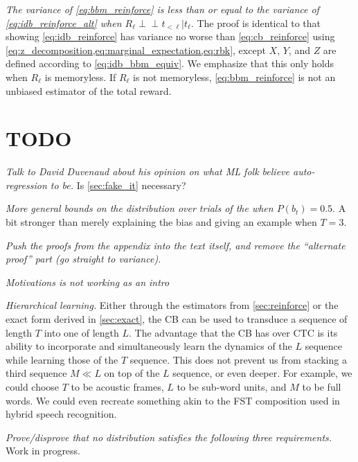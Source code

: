 \documentclass{article}
\newcommand{\ind}{\perp\!\!\!\!\perp}
\begin{document}
\emph{The variance of \cref{eq:bbm_reinforce} is less than or equal to the
variance of \cref{eq:idb_reinforce_alt} when $R_\ell \ind t_{< \ell} |
t_\ell$}. The proof is identical to that showing \cref{eq:idb_reinforce}
has variance no worse than \cref{eq:cb_reinforce} using
\cref{eq:z_decomposition,eq:marginal_expectation,eq:rbk}, except $X$, $Y$, and
$Z$ are defined according to \cref{eq:idb_bbm_equiv}. We emphasize that this
only holds when $R_\ell$ is memoryless. If $R_\ell$ is not memoryless,
\cref{eq:bbm_reinforce} is not an unbiased estimator of the total reward.

\section{TODO}

\emph{Talk to David Duvenaud about his opinion on what ML folk believe
auto-regression to be.} Is \cref{sec:fake_it} necessary?

\emph{More general bounds on the distribution over trials of the
\citeauthor{luoLearningOnlineAlignments2017} when $P(b_t) = 0.5$}. A bit
stronger than merely explaining the bias and giving an example when $T = 3$.

\emph{Push the proofs from the appendix into the text itself, and remove
the ``alternate proof'' part (go straight to variance).}

\emph{Motivations is not working as an intro}

\emph{Hierarchical learning.} Either through the estimators from
\cref{sec:reinforce} or the exact form derived in \cref{sec:exact}, the CB can
be used to transduce a sequence of length $T$ into one of length $L$. The
advantage that the CB has over CTC is its ability to incorporate and
simultaneously learn the dynamics of the $L$ sequence while learning those of
the $T$ sequence. This does not prevent us from stacking a third sequence
$M \ll L$ on top of the $L$ sequence, or even deeper. For example, we could
choose $T$ to be acoustic frames, $L$ to be sub-word units, and $M$ to be full
words. We could even recreate something akin to the FST composition used in
hybrid speech recognition.

\emph{Prove/disprove that no distribution satisfies the following three
requirements.}
Work in progress.
\end{document}
